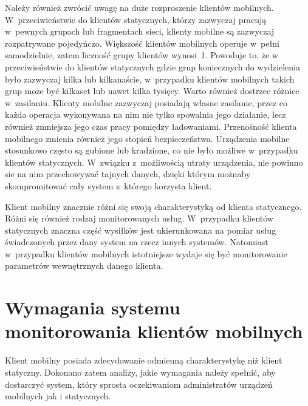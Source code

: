 Należy również zwrócić uwagę na duże rozproszenie klientów
mobilnych. W~przeciwieństwie do klientów statycznych, którzy zazwyczaj
pracują w~pewnych grupach lub fragmentach sieci, klienty mobilne są
zazwyczaj rozpatrywane pojedyńczo. Większość klientów mobilnych
operuje w~pełni samodzielnie, zatem liczność grupy klientów
wynosi~1. Powoduje to, że w przeciwieństwie do klientów statycznych
gdzie grup koniecznych do wydzielenia było zazwyczaj kilka lub
kilkanaście, w~przypadku klientów mobilnych takich grup może być
kilkaset lub nawet kilka tysięcy. Warto również dostrzec różnice
w~zasilaniu. Klienty mobilne zazwyczaj posiadają własne zasilanie,
przez co każda operacja wykonywana na nim nie tylko spowalnia jego
działanie, lecz również zmniejsza jego czas pracy pomiędzy
ładowaniami. Przenośność klienta mobilnego zmienia również jego
stopień bezpieczeństwa. Urządzenia mobilne stosunkowo często są
gubione lub kradzione, co nie było możliwe w~przypadku klientów
statycznych. W~związku z~możliwością utraty urządzenia, nie powinno
sie na nim przechowywać tajnych danych, dzięki którym możnaby
skompromitować cały system z~którego korzysta klient.

Klient mobilny znacznie różni się swoją charakterystyką od klienta
statycznego. Różni się również rodzaj monitorowanych
usług. W~przypadku klientów statycznych znaczna część wysiłków jest
ukierunkowana na pomiar usług świadczonych przez dany system na rzecz
innych systemów. Natomiast w~przypadku klientów mobilnych istotniejsze
wydaje się być monitorowanie parametrów wewnętrznych danego klienta.

\section[Wymagania][Wymagania systemu monitorowania klientów
mobilnych]{Wymagania systemu monitorowania klientów mobilnych}

Klient mobilny posiada zdecydowanie odmienną charakterystykę niż
klient statyczny. Dokonano zatem analizy, jakie wymagania należy
spełnić, aby dostarczyć system, który sprosta oczekiwaniom
administratów urządzeń mobilnych jak i statycznych.

